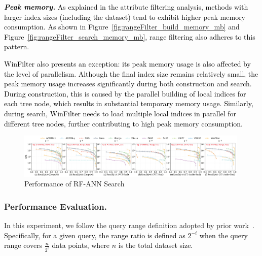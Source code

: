 \documentclass[sigconf, nonacm, pdfa]{acmart}
\begin{document}
{	

	
	\textcolor{black}{\textit{\textbf{Peak memory.}}  
	As explained in the attribute filtering analysis, methods with larger index sizes (including the dataset) tend to exhibit higher peak memory consumption. As shown in Figure~\ref{fig:rangeFilter_build_memory_mb} and Figure~\ref{fig:rangeFilter_search_memory_mb}, range filtering also adheres to this pattern.}  

	\textcolor{black}{WinFilter also presents an exception:  its peak memory usage is also affected by the level of parallelism. Although the final index size remains relatively small, the peak memory usage increases significantly during both construction and search. During construction, this is caused by the parallel building of local indices for each tree node, which results in substantial temporary memory usage. Similarly, during search, WinFilter needs to load multiple local indices in parallel for different tree nodes, further contributing to high peak memory consumption.}
	

	





		
	\begin{figure}[t]
		
		\centering
		
		\includegraphics[width=0.99\textwidth]{figures/exp/exp_8_2.pdf}
		\setlength{\abovecaptionskip}{0.1cm}
		\setlength{\belowcaptionskip}{-0.15cm}
		\caption{Performance of RF-ANN Search}
		\label{fig:exp_8_2}
	\end{figure}
	
	
	\subsubsection{Performance Evaluation. }
	
	In this experiment, we follow the query range definition adopted by prior work~\cite{HQI}. \textcolor{black}{Specifically, for a given query, the range ratio is defined as $2^{-i}$	when the query range covers $\frac{n}{2^i}$ data points, where $n$ is the total dataset size.}


}
\end{document}

